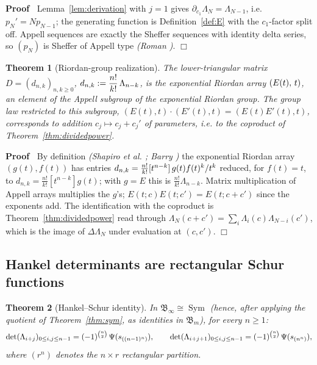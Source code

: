 \documentclass{article}
\newcommand{\assign}{:=}
\newcommand{\tmem}[1]{{\em #1\/}}
\newcommand{\tmop}[1]{\ensuremath{\operatorname{#1}}}
\newenvironment{proof}{\noindent\textbf{Proof\ }}{\hspace*{\fill}$\Box$\medskip}
\newtheorem{theorem}{Theorem}
\newcommand{\Sym}{\tmop{Sym}}
\newcommand{\CA}{\mathfrak{B}}
\begin{document}
\begin{proof}
  Lemma~\ref{lem:derivation} with $j = 1$ gives $\partial_{c_1} \Lambda_N =
  \Lambda_{N - 1}$, i.e. $p_N' = Np_{N - 1}$; the generating function is
  Definition~\ref{def:E} with the $c_1$-factor split off. Appell sequences are
  exactly the Sheffer sequences with identity delta series, so $(p_N)$ is
  Sheffer of Appell type {\tmem{(Roman {\cite[{\textsection}2.5]{Roman}})}}.
\end{proof}

\begin{theorem}
  [Riordan-group realization]\label{thm:riordan} The lower-triangular matrix
  $D = (d_{n, k})_{n, k \ge 0}$, $d_{n, k} \assign \dfrac{n!}{k!}
  \hspace{0.17em} \Lambda_{n - k}$, is the exponential Riordan array $\left( E
  (t), \hspace{0.17em} t \right)$, an element of the Appell subgroup of the
  exponential Riordan group. The group law restricted to this subgroup, $(E
  (t), t) \cdot (E' (t), t) = (E (t) E' (t), t)$, corresponds to addition $c_j
  \mapsto c_j + c_j'$ of parameters, i.e. to the coproduct of
  Theorem~\ref{thm:dividedpower}.
\end{theorem}

\begin{proof}
  By definition {\tmem{(Shapiro et al. {\cite{Shapiro}}; Barry
  {\cite{Barry}})}} the exponential Riordan array $(g (t), f (t))$ has entries
  $d_{n, k} = \frac{n!}{k!} [t^{n - k}]  \hspace{0.17em} g (t) f (t)^k / t^k$
  reduced, for $f (t) = t$, to $d_{n, k} = \frac{n!}{k!} [t^{n - k}] g (t)$;
  with $g = E$ this is $\frac{n!}{k!} \Lambda_{n - k}$. Matrix multiplication
  of Appell arrays multiplies the $g$'s; $E (t ; c) E (t ; c') = E (t ; c +
  c')$ since the exponents add. The identification with the coproduct is
  Theorem~\ref{thm:dividedpower} read through $\Lambda_N  (c + c') = \sum_i
  \Lambda_i (c) \Lambda_{N - i} (c')$, which is the image of $\Delta
  \Lambda_N$ under evaluation at $(c, c')$.
\end{proof}

\subsection{Hankel determinants are rectangular Schur functions}

\begin{theorem}
  [Hankel--Schur identity]\label{thm:hankelschur} In $\CA_{\infty} \cong \Sym$
  (hence, after applying the quotient of Theorem~\ref{thm:sym}, as identities
  in $\CA_m$), for every $n \ge 1$:
  \[ \det (\Lambda_{i + j})_{0 \le i, j \le n - 1} = (- 1)^{\binom{n}{2}} 
     \hspace{0.17em} \Psi (s_{((n - 1)^n)}), \qquad \det (\Lambda_{i + j +
     1})_{0 \le i, j \le n - 1} = (- 1)^{\binom{n}{2}}  \hspace{0.17em} \Psi
     (s_{(n^n)}), \]
  where $(r^n)$ denotes the $n \times r$ rectangular partition.
\end{theorem}
\end{document}
